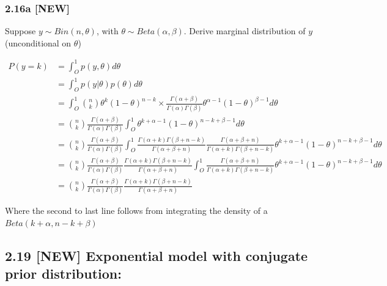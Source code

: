\documentclass[]{article}
\begin{document}
\subsubsection{\texorpdfstring{2.16a
\textbf{{[}NEW{]}}}{2.16a {[}NEW{]}}}\label{a-new}

Suppose \(y \sim Bin(n,\theta)\), with
\(\theta \sim Beta(\alpha, \beta)\). Derive marginal distribution of
\(y\) (unconditional on \(\theta\))

\[
\begin{aligned}
P(y = k) &= \int_{O}^{1}  p(y,\theta) d\theta \\
 &= \int_{O}^{1}  p(y|\theta) p(\theta) d\theta \\
 &= \int_{O}^{1}   {n \choose k} \theta^{k} ( 1 - \theta)^{n-k} \times 
 \frac{\Gamma(\alpha + \beta)}{\Gamma(\alpha)\Gamma(\beta)} \theta^{\alpha - 1} ( 1 - \theta)^{\beta - 1} d\theta \\
 &= {n \choose k} \frac{\Gamma(\alpha + \beta)}{\Gamma(\alpha)\Gamma(\beta)} \int_{O}^{1}  \theta^{k + \alpha - 1} ( 1 - \theta)^{n - k + \beta - 1} d\theta \\
 &= {n \choose k} \frac{\Gamma(\alpha + \beta)}{\Gamma(\alpha)\Gamma(\beta)} \int_{O}^{1} \frac{\Gamma(\alpha + k)\Gamma(\beta + n - k)}{\Gamma(\alpha + \beta + n)} \frac{\Gamma(\alpha + \beta + n)}{\Gamma(\alpha + k)\Gamma(\beta + n - k)}   \theta^{k + \alpha - 1} ( 1 - \theta)^{n - k + \beta - 1} d\theta \\
 &= {n \choose k} \frac{\Gamma(\alpha + \beta)}{\Gamma(\alpha)\Gamma(\beta)} \frac{\Gamma(\alpha + k)\Gamma(\beta + n - k)}{\Gamma(\alpha + \beta + n)}  \int_{O}^{1}  \frac{\Gamma(\alpha + \beta + n)}{\Gamma(\alpha + k)\Gamma(\beta + n - k)}   \theta^{k + \alpha - 1} ( 1 - \theta)^{n - k + \beta - 1} d\theta \\
 &= {n \choose k} \frac{\Gamma(\alpha + \beta)}{\Gamma(\alpha)\Gamma(\beta)} \frac{\Gamma(\alpha + k)\Gamma(\beta + n - k)}{\Gamma(\alpha + \beta + n)} 
\end{aligned}
\]

Where the second to last line follows from integrating the density of a
\(Beta(k + \alpha, n - k + \beta)\)

\subsection{\texorpdfstring{2.19 \textbf{{[}NEW{]}} Exponential model
with conjugate prior
distribution:}{2.19 {[}NEW{]} Exponential model with conjugate prior distribution:}}\label{new-exponential-model-with-conjugate-prior-distribution}
\end{document}
